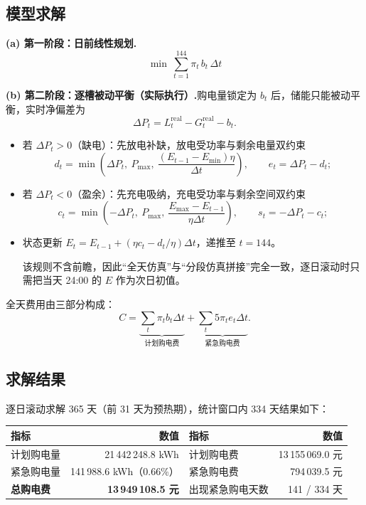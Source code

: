 \documentclass{cumcmthesis}
\begin{document}
\subsection{模型求解}
\noindent\textbf{(a) 第一阶段：日前线性规划.}
\begin{equation}
    \min\ \sum_{t=1}^{144}\pi_t\,b_t\,\Delta t
\end{equation}

\noindent\textbf{(b) 第二阶段：逐槽被动平衡（实际执行）.}购电量锁定为 $b_t$ 后，储能只能被动平衡，实时净偏差为
\begin{equation}
    \Delta P_t=L^{\mathrm{real}}_t-G^{\mathrm{real}}_t-b_t .
\end{equation}
\begin{itemize}
    \item 若 $\Delta P_t>0$（缺电）：先放电补缺，放电受功率与剩余电量双约束
    \begin{equation}
        d_t=\min\left(\Delta P_t,\ P_{\max},\ \frac{(E_{t-1}-E_{\min})\eta}{\Delta t}\right),\qquad
        e_t=\Delta P_t-d_t ;
    \end{equation}
    \item 若 $\Delta P_t<0$（盈余）：先充电吸纳，充电受功率与剩余空间双约束
    \begin{equation}
        c_t=\min\left(-\Delta P_t,\ P_{\max},\ \frac{E_{\max}-E_{t-1}}{\eta\Delta t}\right),\qquad
        s_t=-\Delta P_t-c_t ;
    \end{equation}
    \item 状态更新 $E_t=E_{t-1}+(\eta c_t-d_t/\eta)\Delta t$，递推至 $t=144$。

    该规则不含前瞻，因此“全天仿真”与“分段仿真拼接”完全一致，逐日滚动时只需把当天 24:00 的 $E$ 作为次日初值。
\end{itemize}

全天费用由三部分构成：
\begin{equation}
    C=\underbrace{\sum_t \pi_t b_t\Delta t}_{\text{计划购电费}}+\underbrace{\sum_t 5\pi_t e_t\Delta t}_{\text{紧急购电费}} .
\end{equation}

\subsection{求解结果}
逐日滚动求解 365 天（前 31 天为预热期），统计窗口内 334 天结果如下：

\begin{center}
\begin{tabular}{lrlr}
\hline
指标 & 数值 & 指标 & 数值 \\
\hline
计划购电量 & 21\,442\,248.8 kWh & 计划购电费 & 13\,155\,069.0 元 \\
紧急购电量 & 141\,988.6 kWh（0.66\%） & 紧急购电费 & 794\,039.5 元 \\
\textbf{总购电费} & \textbf{13\,949\,108.5 元} & 出现紧急购电天数 & 141 / 334 天 \\
\hline
\end{tabular}
\end{center}
\end{document}
